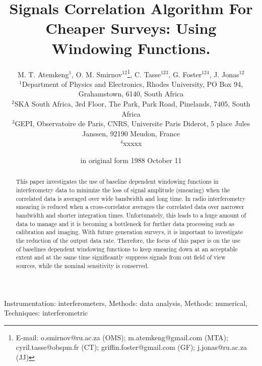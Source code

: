 \documentclass[useAMS,usenatbib]{mn2e}
\title[Correlator Windowing Functions For Cheaper Surveys]{Signals Correlation Algorithm For Cheaper Surveys: Using Windowing Functions. 
}
\author[M. T. Atemkeng , O. M. Smirnov, C. Tasse, G. Foster and J. Jonas]{M. T. Atemkeng$^{1}$, O. M. Smirnov$^{12}$\thanks{E-mail: 
o.smirnov@ru.ac.za (OMS); m.atemkeng@gmail.com (MTA); cyril.tasse@obspm.fr (CT); griffin.foster@gmail.com (GF); j.jonas@ru.ac.za (JJ)}, 
 C. Tasse$^{123}$, G. Foster$^{124}$, J. Jonas$^{12}$ \\
$^1$Department of Physics and Electronics, Rhodes University, PO Box 94, Grahamstown, 6140, South Africa\\
$^2$SKA South Africa, 3rd Floor, The Park, Park Road, Pinelands, 7405, South Africa\\
$^3$GEPI, Observatoire de Paris, CNRS, Universite Paris Diderot, 5 place Jules Janssen, 92190 Meudon, France\\
$^4$xxxxx}
\begin{document}
\date{in original form 1988 October 11}

\pagerange{\pageref{firstpage}--\pageref{lastpage}} 

\maketitle

\label{firstpage}

\begin{abstract}
This paper investigates the use of baseline dependent windowing functions in interferometry data to minimize the loss of 
signal amplitude (smearing) when the correlated data is averaged over wide bandwidth and long time. In radio interferometry smearing is 
reduced when a cross-correlator averages the correlated data over narrower bandwidth and shorter integration times. Unfortunately, this 
leads to a huge amount of data to manage and it is becoming a bottleneck for further data processing such as calibration and 
imaging.  With future generation surveys, it is important to investigate the reduction of the output data rate. Therefore, the focus of 
this paper is on the use of baselines dependent windowing functions to keep smearing down at an acceptable extent and at the same time 
significantly suppress signals 
from out field of view sources, while the nominal sensitivity is conserved. 
\end{abstract}
\begin{keywords}
Instrumentation: interferometers, Methods: data analysis, Methods: numerical, Techniques: interferometric
\end{keywords}
\end{document}
